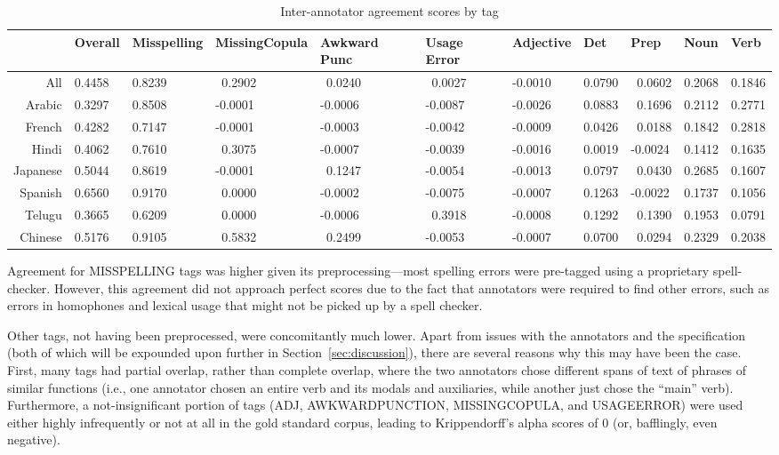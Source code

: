 \documentclass[10pt, a4paper]{article}
\begin{document}
\begin{table*}[ht]
	\begin{tabular}{r|llp{1.25cm}p{1.25cm}p{1.1cm}lllll}
		& Overall  & Misspelling & Missing\newline Copula & Awkward Punc & Usage Error & Adjective & Det & Prep & Noun    & Verb      \\\hline
		All      & 0.4458      & 0.8239         & ~0.2902              & ~0.0240       & ~0.0027    & -0.0010     & 0.0790       & ~0.0602  & 0.2068 & 0.1846 \\
		Arabic   & 0.3297      & 0.8508         & -0.0001             & -0.0006     & -0.0087   & -0.0026    & 0.0883      & ~0.1696  & 0.2112 & 0.2771 \\
		French   & 0.4282      & 0.7147         & -0.0001             & -0.0003     & -0.0042   & -0.0009    & 0.0426      & ~0.0188  & 0.1842 & 0.2818 \\
		Hindi    & 0.4062      & 0.7610          & ~0.3075              & -0.0007     & -0.0039   & -0.0016    & 0.0019      & -0.0024 & 0.1412 & 0.1635 \\
		Japanese & 0.5044      & 0.8619         & -0.0001             & ~0.1247      & -0.0054   & -0.0013    & 0.0797      & ~0.0430   & 0.2685 & 0.1607 \\
		Spanish  & 0.6560       & 0.9170          & ~0.0000                   & -0.0002     & -0.0075   & -0.0007    & 0.1263      & -0.0022 & 0.1737 & 0.1056 \\
		Telugu   & 0.3665      & 0.6209         & ~0.0000                  & -0.0006     & ~0.3918    & -0.0008    & 0.1292      & ~0.1390   & 0.1953 & 0.0791 \\
		Chinese  & 0.5176      & 0.9105         & ~0.5832              & ~0.2499      & -0.0053   & -0.0007    & 0.0700        & ~0.0294  & 0.2329 & 0.2038
	\end{tabular}
\caption{Inter-annotator agreement scores by tag\label{table:iaa}}
\end{table*}

Agreement for MISSPELLING tags was higher given its preprocessing---most spelling errors were pre-tagged using a proprietary spell-checker. However, this agreement did not approach perfect scores due to the fact that annotators were required to find other errors, such as errors in homophones and lexical usage that might not be picked up by a spell checker. 

Other tags, not having been preprocessed, were concomitantly much lower. Apart from issues with the annotators and the specification (both of which will be expounded upon further in Section~\ref{sec:discussion}), there are several reasons why this may have been the case. First, many tags had partial overlap, rather than complete overlap, where the two annotators chose different spans of text of phrases of similar functions (i.e., one annotator chosen an entire verb and its modals and auxiliaries, while another just chose the ``main'' verb). Furthermore, a not-insignificant portion of tags (ADJ, AWKWARDPUNCTION, MISSINGCOPULA, and USAGEERROR) were used either highly infrequently or not at all in the gold standard corpus, leading to Krippendorff's alpha scores of 0 (or, bafflingly, even negative). 
\end{document}
